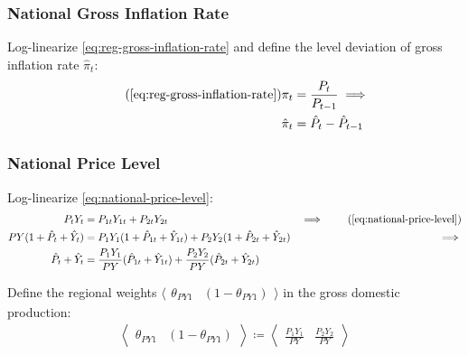 \documentclass[../thesis.tex]{subfiles}
\begin{document}

\subsubsection*{National Gross Inflation Rate}

Log-linearize \ref{eq:reg-gross-inflation-rate} and define the level deviation of gross inflation rate $\hat{\pi}_t$:
\begin{align}
	\tag{\ref{eq:reg-gross-inflation-rate}}
	\pi_{t} &= \frac{P_{t}}{P_{t-1}} \implies \\
	\hat{\pi}_{t} &= \hat{P}_{t} - \hat{P}_{t-1}
	\label{eq:reg-level-dev-gross-inflation-rate}
\end{align}


\subsubsection*{National Price Level}

Log-linearize \ref{eq:national-price-level}:
\begin{alignat}{2}
	P_{t} Y_{t} &= P_{1t} Y_{1t} + P_{2t} Y_{2t} & \implies \tag{\ref{eq:national-price-level}} \\ 
	P Y (1 + \hat{P}_{t} + \hat{Y}_{t}) &= P_{1} Y_{1} (1 + \hat{P}_{1t} + \hat{Y}_{1t}) + P_{2} Y_{2} (1 + \hat{P}_{2t} + \hat{Y}_{2t}) &\implies \nonumber \\
	\hat{P}_{t} + \hat{Y}_{t} &= \frac{P_{1} Y_{1}}{P Y} (\hat{P}_{1t} + \hat{Y}_{1t}) + \frac{P_{2} Y_{2}}{P Y} (\hat{P}_{2t} + \hat{Y}_{2t}) \label{eq:reg-ll-national-price-level}
\end{alignat}

	Define the regional weights $\langle \begin{smallmatrix} \theta_{PY1} & (1-\theta_{PY1}) \end{smallmatrix} \rangle$ in the gross domestic production:
	\begin{align}
		\left\langle \begin{matrix} \theta_{PY1} & (1-\theta_{PY1}) \end{matrix} \right\rangle \coloneq \left\langle \begin{matrix} \frac{P_{1} Y_{1}}{P Y} & \frac{P_{2} Y_{2}}{PY} \end{matrix} \right\rangle \label{eq:reg-ss-PYn-weight-in-PY}
	\end{align}
\end{document}
